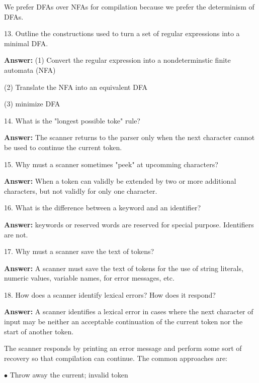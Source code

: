 \vskip 2mm
We prefer DFAs over NFAs for compilation because we prefer the determinism of DFAs.

\filbreak
\vskip 1cm

13. Outline the constructions used to turn a set of regular expressions into a minimal DFA.

\vskip 3mm
{\bf Answer:}
\vskip 1mm
(1) Convert the regular expression into a nondeterminstic finite automata (NFA)

\vskip 1mm
(2) Translate the NFA into an equivalent DFA

\vskip 1mm
(3) minimize DFA

\filbreak
\vskip 1cm

14. What is the "longest possible toke" rule?

\vskip 3mm
{\bf Answer:} The scanner returns to the parser only when the next character cannot be used to continue the current token.

\filbreak
\vskip 1cm

15. Why must a scanner sometimes "peek" at upcomming characters?

\vskip 3mm
{\bf Answer:} When a token can validly be extended by two or more additional characters, but not validly for only one character.

\filbreak
\vskip 1cm

16. What is the difference between a keyword and an identifier?

\vskip 3mm
{\bf Answer:} keywords or reserved words  are reserved for special purpose. Identifiers are not.

\filbreak
\vskip 1cm

17. Why must a scanner save the text of tokens?

\vskip 3mm
{\bf Answer:} A scanner must save the text of tokens for the use of string literals, numeric values, variable names, for error messages, etc.

\filbreak
\vskip 1cm

18. How does a scanner identify lexical errors? How does it respond?

\vskip 3mm
{\bf Answer:} A scanner identifies a lexical error in cases where the next character of input may be neither an acceptable continuation of the current token nor the start of another token.

\vskip 2mm
The scanner responds by printing an error message and perform some sort of recovery so that compilation can continue. The common approaches are:

\vskip 1mm
\qquad$\bullet$ Throw away the current; invalid token

